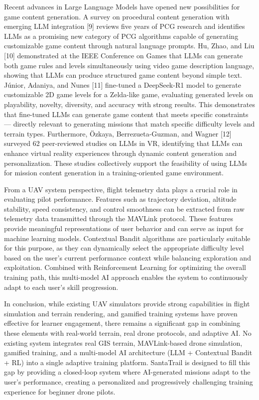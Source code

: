 Recent advances in Large Language Models have opened new possibilities for game content generation. A survey on procedural content generation with emerging LLM integration [9] reviews five years of PCG research and identifies LLMs as a promising new category of PCG algorithms capable of generating customizable game content through natural language prompts. Hu, Zhao, and Liu [10] demonstrated at the IEEE Conference on Games that LLMs can generate both game rules and levels simultaneously using video game description language, showing that LLMs can produce structured game content beyond simple text. Júnior, Adaniya, and Nunes [11] fine-tuned a DeepSeek-R1 model to generate customizable 2D game levels for a Zelda-like game, evaluating generated levels on playability, novelty, diversity, and accuracy with strong results. This demonstrates that fine-tuned LLMs can generate game content that meets specific constraints — directly relevant to generating missions that match specific difficulty levels and terrain types. Furthermore, Özkaya, Berrezueta-Guzman, and Wagner [12] surveyed 62 peer-reviewed studies on LLMs in VR, identifying that LLMs can enhance virtual reality experiences through dynamic content generation and personalization. These studies collectively support the feasibility of using LLMs for mission content generation in a training-oriented game environment.

From a UAV system perspective, flight telemetry data plays a crucial role in evaluating pilot performance. Features such as trajectory deviation, altitude stability, speed consistency, and control smoothness can be extracted from raw telemetry data transmitted through the MAVLink protocol. These features provide meaningful representations of user behavior and can serve as input for machine learning models. Contextual Bandit algorithms are particularly suitable for this purpose, as they can dynamically select the appropriate difficulty level based on the user's current performance context while balancing exploration and exploitation. Combined with Reinforcement Learning for optimizing the overall training path, this multi-model AI approach enables the system to continuously adapt to each user's skill progression.

In conclusion, while existing UAV simulators provide strong capabilities in flight simulation and terrain rendering, and gamified training systems have proven effective for learner engagement, there remains a significant gap in combining these elements with real-world terrain, real drone protocols, and adaptive AI. No existing system integrates real GIS terrain, MAVLink-based drone simulation, gamified training, and a multi-model AI architecture (LLM + Contextual Bandit + RL) into a single adaptive training platform. SantaTrail is designed to fill this gap by providing a closed-loop system where AI-generated missions adapt to the user's performance, creating a personalized and progressively challenging training experience for beginner drone pilots.
